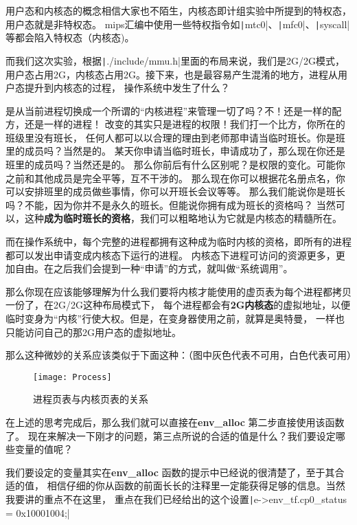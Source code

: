 \begin{note}
用户态和内核态的概念相信大家也不陌生，内核态即计组实验中所提到的特权态，用户态就是非特权态。
mips汇编中使用一些特权指令如\texttt|mtc0|、\texttt|mfc0|、\texttt|syscall|等都会陷入特权态（内核态)。
\end{note}

而我们这次实验，根据\texttt|./include/mmu.h|里面的布局来说，我们是2G/2G模式，
用户态占用2G，内核态占用2G。接下来，也是最容易产生混淆的地方，进程从用户态提升到内核态的过程，
操作系统中发生了什么？

是从当前进程切换成一个所谓的“内核进程”来管理一切了吗？不！还是一样的配方，还是一样的进程！
改变的其实只是进程的权限！我们打一个比方，你所在的班级里没有班长，
任何人都可以以合理的理由到老师那申请当临时班长。你是班里的成员吗？当然是的。
某天你申请当临时班长，申请成功了，那么现在你还是班里的成员吗？当然还是的。
那么你前后有什么区别呢？是权限的变化。可能你之前和其他成员是完全平等，互不干涉的。
那么现在你可以根据花名册点名，你可以安排班里的成员做些事情，你可以开班长会议等等。
那么我们能说你是班长吗？不能，因为你并不是永久的班长。但能说你拥有成为班长的资格吗？
当然可以，这种\textbf{成为临时班长的资格}，我们可以粗略地认为它就是内核态的精髓所在。

而在操作系统中，每个完整的进程都拥有这种成为临时内核的资格，即所有的进程都可以发出申请变成内核态下运行的进程。
内核态下进程可访问的资源更多，更加自由。在之后我们会提到一种“申请”的方式，就叫做“系统调用”。

那么你现在应该能够理解为什么我们要将内核才能使用的虚页表为每个进程都拷贝一份了，在2G/2G这种布局模式下，
每个进程都会有\textbf{2G内核态}的虚拟地址，以便临时变身为“内核”行使大权。但是，在变身器使用之前，就算是奥特曼，
一样也只能访问自己的那2G用户态的虚拟地址。

那么这种微妙的关系应该类似于下面这种：（图中灰色代表不可用，白色代表可用）
\begin{figure}[htbp]
  \centering
  \texttt{[image: Process]}
  \caption{进程页表与内核页表的关系}\label{fig:Process} 
\end{figure}


在上述的思考完成后，那么我们就可以直接在\textbf{env\_alloc} 第二步直接使用该函数了。
现在来解决一下刚才的问题，第三点所说的合适的值是什么？我们要设定哪些变量的值呢？

我们要设定的变量其实在\textbf{env\_alloc} 函数的提示中已经说的很清楚了，至于其合适的值，
相信仔细的你从函数的前面长长的注释里一定能获得足够的信息。当然我要讲的重点不在这里，
重点在我们已经给出的这个设置\texttt|e->env_tf.cp0_status = 0x10001004;|

